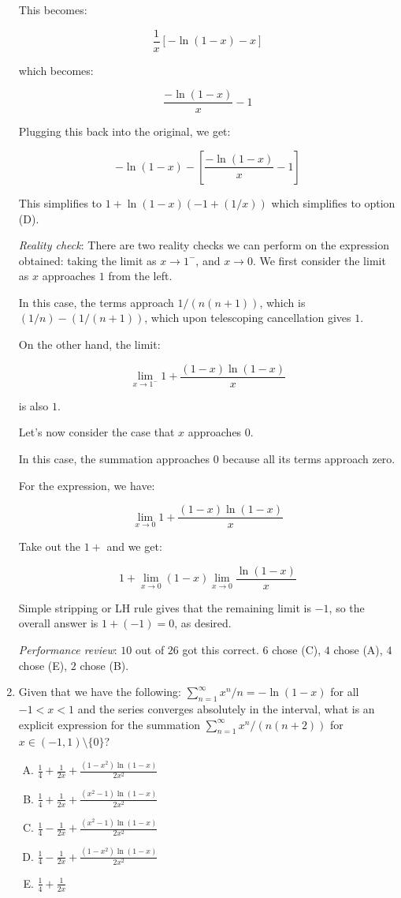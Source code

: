 \documentclass[10pt]{amsart}
\begin{document}
\begin{enumerate}
  This becomes:

  $$\frac{1}{x}\left[-\ln(1 - x) - x \right]$$

  which becomes:

  $$\frac{-\ln(1 - x)}{x} - 1$$

  Plugging this back into the original, we get:

  $$-\ln(1 - x) - \left[\frac{-\ln(1 - x)}{x} - 1\right]$$

  This simplifies to $1 + \ln(1 - x)(-1 + (1/x))$ which simplifies to
  option (D).

  {\em Reality check}: There are two reality checks we can perform on
  the expression obtained: taking the limit as $x \to 1^-$, and $x \to
  0$. We first consider the limit as $x$ approaches $1$ from the left.

  In this case, the terms approach $1/(n(n+1))$, which is $(1/n) -
  (1/(n+1))$, which upon telescoping cancellation gives $1$.

  On the other hand, the limit:

  $$\lim_{x \to 1^-} 1 + \frac{(1 - x)\ln(1 - x)}{x}$$

  is also $1$.

  Let's now consider the case that $x$ approaches $0$.

  In this case, the summation approaches $0$ because all its terms
  approach zero.

  For the expression, we have:

  $$\lim_{x \to 0} 1 + \frac{(1 - x)\ln(1 - x)}{x}$$

  Take out the $1 + $ and we get:

  $$1 + \lim_{x \to 0} (1 - x) \lim_{x \to 0} \frac{\ln(1 - x)}{x}$$

  Simple stripping or LH rule gives that the remaining limit is $-1$,
  so the overall answer is $1 + (-1) = 0$, as desired.

  {\em Performance review}: $10$ out of $26$ got this correct. $6$
  chose (C), $4$ chose (A), $4$ chose (E), $2$ chose (B).

\item Given that we have the following: $\sum_{n=1}^\infty x^n/n =
  -\ln(1 - x)$ for all $-1 < x < 1$ and the series converges
  absolutely in the interval, what is an explicit expression for the
  summation $\sum_{n=1}^\infty x^n/(n(n+2))$ for $x \in (-1,1)
  \setminus \{ 0 \}$?

  \begin{enumerate}[(A)]
  \item $\frac{1}{4} + \frac{1}{2x} + \frac{(1 - x^2)\ln(1 - x)}{2x^2}$
  \item $\frac{1}{4} + \frac{1}{2x} + \frac{(x^2 - 1)\ln(1 - x)}{2x^2}$
  \item $\frac{1}{4} - \frac{1}{2x} + \frac{(x^2 - 1)\ln(1 - x)}{2x^2}$
  \item $\frac{1}{4} - \frac{1}{2x} + \frac{(1 - x^2)\ln(1 - x)}{2x^2}$
  \item $\frac{1}{4} + \frac{1}{2x}$
  \end{enumerate}


\end{enumerate}
\end{document}
